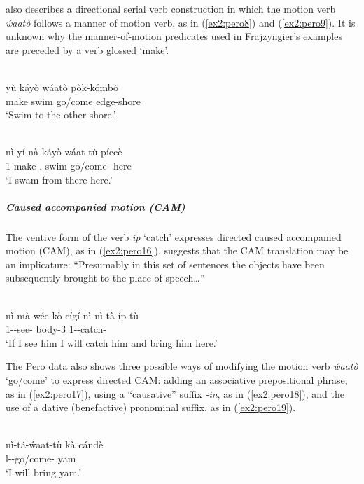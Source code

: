 \citet[250]{frajzyngierGrammarPero1989} also describes a directional serial verb construction in which the motion verb \textit{ẃaatò} follows a manner of motion verb, as in (\ref{ex2:pero8}) and (\ref{ex2:pero9}).  It is unknown why the manner-of-motion predicates used in Frajzyngier’s examples are preceded by a verb glossed `make'. 

\ea\label{ex2:pero8}
 \\
\gll yù	káyò	wáatò	pòk-kómbò	 \\
make	swim	go/come	edge-shore \\
\glt `Swim to the other shore.'

\ex\label{ex2:pero9}
 \\
\gll nì-yí-nà	káyò	wáat-tù	píccè \\
1-make-.	swim	go/come-	here	 \\
\glt `I swam from there here.'
\z 

\subparagraph{Caused accompanied motion (CAM)}



The ventive form of the verb \textit{íp} `catch' expresses directed caused accompanied motion (CAM), as in (\ref{ex2:pero16}). \citet[96]{frajzyngierGrammarPero1989} suggests that the CAM translation may be an implicature: ``Presumably in this set of sentences the objects have been subsequently brought to the place of speech…''

\ea\label{ex2:pero16}
 \\
\gll nì-mà-wée-kò	cígí-nì	nì-tà-íp-tù \\
1--see-	body-3	1--catch- \\
\glt `If I see him I will catch him and bring him here.'
\z 

The Pero data also shows three possible ways of modifying the motion verb \textit{ẃaatò} `go/come' to express directed CAM: adding an associative prepositional phrase, as in (\ref{ex2:pero17}), using a ``causative'' suffix \textit{-in}, as in (\ref{ex2:pero18}), and the use of a dative (benefactive) pronominal suffix, as in (\ref{ex2:pero19}).

\ea\label{ex2:pero17}
 \\
\gll nì-tá-ẃaat-tù kà cándè	\\
l--go/come-  yam		\\
\glt `I will bring yam.'

